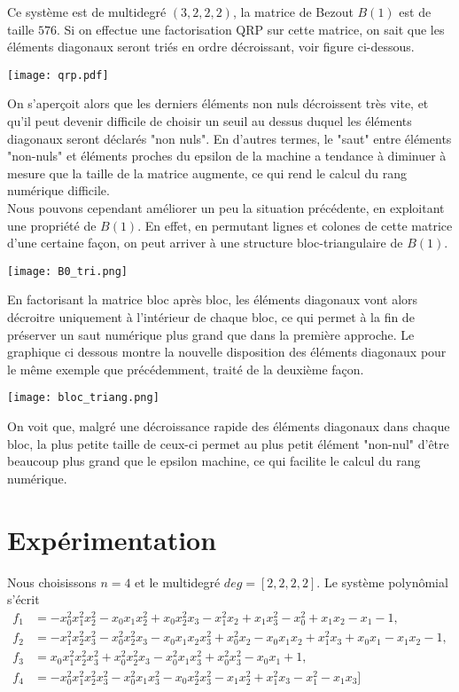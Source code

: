 \documentclass{article}
\theoremstyle{plain}%
\theoremstyle{definition}
\theoremstyle{remark}
\begin{document}
Ce système est de multidegré $(3, 2, 2, 2)$, la matrice de Bezout $B(1)$ est de taille $576$. Si on effectue une factorisation QRP sur cette matrice, on sait que les éléments diagonaux seront triés en ordre décroissant, voir figure ci-dessous.
\begin{center}
\texttt{[image: qrp.pdf]}
\end{center}
 On s'aperçoit alors que les derniers éléments non nuls décroissent très vite, et qu'il peut devenir difficile de choisir un seuil au dessus duquel les éléments diagonaux seront déclarés "non nuls".
En d'autres termes, le "saut" entre éléments "non-nuls" et éléments proches du epsilon de la machine a tendance à diminuer à mesure que la taille de la matrice augmente, ce qui rend le calcul du rang numérique difficile.\\
Nous pouvons cependant améliorer un peu la situation précédente, en exploitant une propriété de $B(1)$. En effet, en permutant lignes et colones de cette matrice d'une certaine façon, on peut arriver à une structure bloc-triangulaire de $B(1)$. 
\begin{center}
\texttt{[image: B0\_tri.png]}
\end{center}
En factorisant la matrice bloc après bloc, les éléments diagonaux vont alors décroitre uniquement à l'intérieur de chaque bloc, ce qui permet à la fin de préserver un saut numérique plus grand que dans la première approche. Le graphique ci dessous montre la nouvelle disposition des éléments diagonaux pour le même exemple que précédemment, traité de la deuxième façon.
\begin{center}
\texttt{[image: bloc\_triang.png]}
\end{center}
On voit que, malgré une décroissance rapide des éléments diagonaux dans chaque bloc, la plus petite taille de ceux-ci permet au plus petit élément "non-nul" d'être beaucoup plus grand que le epsilon machine, ce qui facilite le calcul du rang numérique.

\section{Expérimentation}
Nous choisissons $n=4$ et le multidegré $deg=[2,2,2,2]$. Le système polynômial s'écrit
\begin{align}
f_1 & = 
-x_0^2x_1^2x_2^2 - x_0x_1x_2^2 + x_0x_2^2x_3 - x_1^2x_2 + x_1x_3^2 - x_0^2 + x_1x_2 - x_1 - 1, \nonumber\\
f_2 & =
 -x_1^2x_2^2x_3^2 - x_0^2x_2^2x_3 - x_0x_1x_2x_3^2 + x_0^2x_2 - x_0x_1x_2 + x_1^2x_3 + x_0x_1 - x_1x_2 - 1, \nonumber\\
 f_3 & =
 x_0x_1^2x_2^2x_3^2 + x_0^2x_2^2x_3 - x_0^2x_1x_3^2 + x_0^2x_3^2 - x_0x_1 + 1, \nonumber\\
 f_4 & =
 -x_0^2x_1^2x_2^2x_3^2 - x_0^2x_1x_3^2 - x_0x_2^2x_3^2 - x_1x_2^2 + x_1^2x_3 - x_1^2 - x_1x_3] \nonumber\\
 \end{align}
\end{document}

